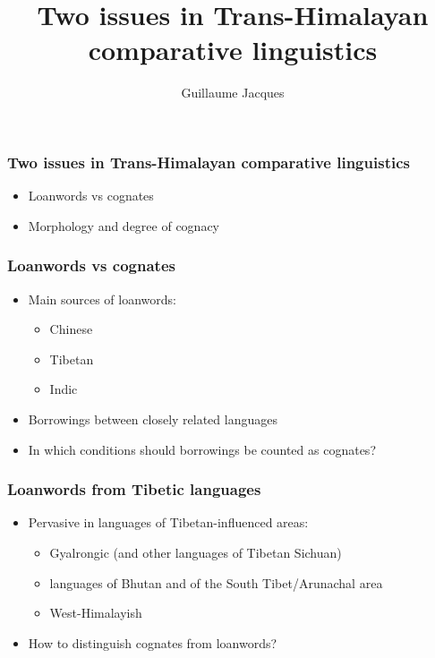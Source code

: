 \documentclass[xcolor=table]{beamer}
\begin{document}
 \title{Two issues in Trans-Himalayan comparative linguistics}
 \author{Guillaume Jacques}
 \maketitle


 \begin{frame} 
 \frametitle{Two issues in Trans-Himalayan comparative linguistics}
 \begin{itemize}[<+->]
 \item Loanwords vs cognates
 \item Morphology and degree of cognacy
 \end{itemize}
\end{frame}

 \begin{frame} 
 \frametitle{Loanwords vs cognates}
 \begin{itemize}[<+->]
 \item Main sources of loanwords: 
  \begin{itemize}[<+->]
  \item Chinese
  \item Tibetan
    \item Indic
   \end{itemize}
 \item Borrowings between closely related languages
 \item In which conditions should borrowings be counted as cognates?
 \end{itemize}
\end{frame}

 \begin{frame} 
 \frametitle{Loanwords from Tibetic languages}
 \begin{itemize}[<+->]
 \item Pervasive in languages of Tibetan-influenced areas:
  \begin{itemize}[<+->]
 \item Gyalrongic (and other languages of Tibetan Sichuan)
   \item languages of Bhutan and of the South Tibet/Arunachal area
  \item West-Himalayish
  \end{itemize}
 \item How to distinguish cognates from loanwords?
 \end{itemize}
\end{frame}
\end{document}
